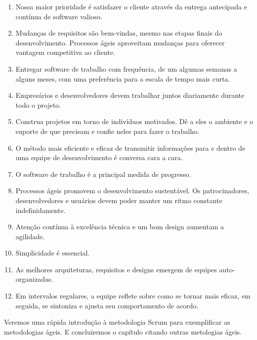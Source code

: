 \documentclass[
	11pt,				%
	openright,
	twoside,			%
	a4paper,			%
	english,			%
	french,
	brazil,				%
	sumario=tradicional
	]{abntex2}
\begin{document}
\begin{enumerate}
\item 
Nossa maior prioridade é satisfazer o cliente através da entrega antecipada e contínua de software valioso.

\item
Mudanças de requisitos são bem-vindas, mesmo nas etapas finais do desenvolvimento. Processos ágeis aproveitam mudanças para oferecer vantagem competitiva ao cliente.

\item
Entregar software de trabalho com frequência, de um algumas semanas a alguns meses, com uma preferência para a escala de tempo mais curta.

\item
Empresários e desenvolvedores devem trabalhar juntos diariamente durante todo o projeto.

\item
Construa projetos em torno de indivíduos motivados. Dê a eles o ambiente e o suporte de que precisam e confie neles para fazer o trabalho.

\item
O método mais eficiente e eficaz de transmitir informações para e dentro de uma equipe de desenvolvimento é conversa cara a cara.

\item
O software de trabalho é a principal medida de progresso.

\item
Processos ágeis promovem o desenvolvimento sustentável. Os patrocinadores, desenvolvedores e usuários devem poder manter um ritmo constante indefinidamente.

\item
Atenção contínua à excelência técnica e um bom design aumentam a agilidade.

\item
Simplicidade é essencial.

\item
As melhores arquiteturas, requisitos e designs emergem de equipes auto-organizadas.

\item
Em intervalos regulares, a equipe reflete sobre como se tornar mais eficaz, em seguida, se sintoniza e ajusta seu comportamento de acordo.
\end{enumerate}

Veremos uma rápida introdução à metodologia Scrum para exemplificar as metodologias ágeis. E concluiremos o capítulo citando outras metologias ágeis.
\end{document}
